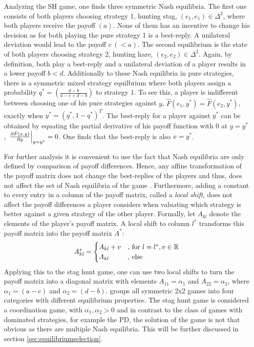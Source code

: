 Analyzing the SH game, one finds three symmetric Nash equilibria.
The first one consists of both players choosing strategy 1, 
hunting stag, $(e_1,e_1) \in
\Delta^2$, where both players receive the payoff $(a)$. 
None of them has an incentive to change his decision as for both
playing the pure strategy 1 is a best-reply. A unilateral deviation would 
lead to the payoff $c\ (< a)$.
The second equilibrium is the state of 
both players choosing strategy 2, hunting hare, $(e_2,e_2)
\in \Delta^2$. Again, by definition, both play a best-reply and a unilateral 
deviation of a player results in a lower payoff $b<d$.
Additionally to these Nash equilibria in pure strategies, there is a symmetric
mixed strategy equilbrium where both players assign a probability 
$q^*=\left(\frac{d-b}{a-c+d-b}\right)$ to strategy 1. 
To see this, a player is indifferent between choosing one of his pure
strategies against $y$, $\hat{F}(e_1,y^*) = \hat{F}(e_2,y^*)$, exactly
when $y^*=(q^*,1-q^*)^T$. The best-reply for a player against $y^*$ can 
be obtained by equating the partial derivative of his payoff function 
with 0 at $y=y^*$, 
$\eval{\frac{\partial \hat{F}(x,y)}{\partial y}}_{y=y^*} = 0$.
One finds that the best-reply is also $x=y^*$. 

For further analysis it is convenient to use the fact that Nash equilibria 
are only defined by comparison of payoff differences. 
Hence, any affine transformation of the payoff matrix does not change the 
best-replies of the players and thus, does not affect the set of Nash equilibria 
of the game \parencite[17-19]{weibull_evolutionary_1997}. 
Furthermore, adding a constant to every entry in a 
column of the payoff matrix, 
called a \textit{local shift}, does not affect the payoff differences
a player considers when valuating which strategy is better against a given
strategy of the other player.
Formally, let $A_{kl}$ denote the elements of the player's payoff matrix. 
A local shift to column $l^*$ transforms this payoff matrix into the payoff 
matrix $A^*$:
\begin{align*}
        A^*_{kl} =
        \begin{cases}
                A_{kl} + v & \text{,\ for}\ l=l^*, v \in \mathbb{R} \\
                A_{kl} & \text{,\ else}
        \end{cases}
\end{align*}
Applying this to the stag hunt game, one can use two local shifts to turn 
the payoff matrix into a diagonal matrix with elements $A_{11}=\alpha_1$ 
and $A_{22}=\alpha_2$, where $\alpha_1=(a-c)$ and $\alpha_2=(d-b)$. 
\textcite[28]{weibull_evolutionary_1997} groups all symmetric 2x2 games into 
four categories with different equilibrium properties. 
The stag hunt game is considered a coordination 
game, with $\alpha_1, \alpha_2 > 0$ and in contrast to the class of games
with dominated strategies, for example the PD, the solution of the game
is not that obvious as there are multiple Nash equilibria.
This will be further discussed in section \ref{sec:equilibriumselection}.

